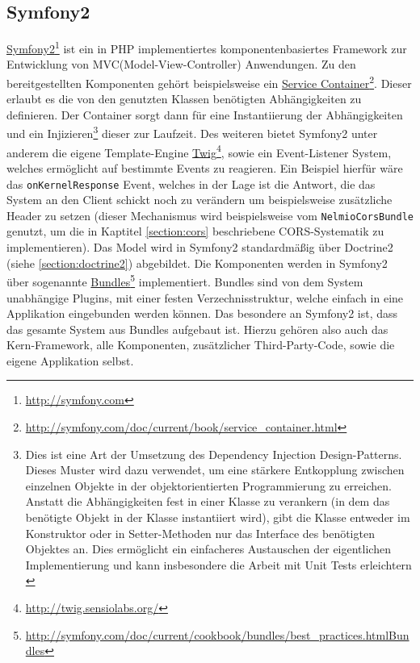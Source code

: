 \subsection{Symfony2}
\href{http://symfony.com}{Symfony2}\footnote{\url{http://symfony.com}} ist ein in PHP implementiertes komponentenbasiertes Framework zur Entwicklung von MVC(Model-View-Controller) Anwendungen. Zu den bereitgestellten Komponenten gehört beispielsweise ein \href{http://symfony.com/doc/current/book/service_container.html}{Service Container}\footnote{\url{http://symfony.com/doc/current/book/service_container.html}}. Dieser erlaubt es die von den genutzten Klassen benötigten Abhängigkeiten zu definieren. Der Container sorgt dann für eine Instantiierung der Abhängigkeiten und ein Injizieren\footnote{Dies ist eine Art der Umsetzung des Dependency Injection Design-Patterns. Dieses Muster wird dazu verwendet, um eine stärkere Entkopplung zwischen einzelnen Objekte in der objektorientierten Programmierung zu erreichen. Anstatt die Abhängigkeiten fest in einer Klasse zu verankern (in dem das benötigte Objekt in der Klasse instantiiert wird), gibt die Klasse entweder im Konstruktor oder in Setter-Methoden nur das Interface des benötigten Objektes an. Dies ermöglicht ein einfacheres Austauschen der eigentlichen Implementierung und kann insbesondere die Arbeit mit Unit Tests erleichtern \cite{fowler_dependency_injection}} dieser zur Laufzeit. Des weiteren bietet Symfony2 unter anderem die eigene Template-Engine \href{http://twig.sensiolabs.org/}{Twig}\footnote{\url{http://twig.sensiolabs.org/}}, sowie ein Event-Listener System, welches ermöglicht auf bestimmte Events zu reagieren. Ein Beispiel hierfür wäre das \texttt{onKernelResponse} Event, welches in der Lage ist die Antwort, die das System an den Client schickt noch zu verändern um beispielsweise zusätzliche Header zu setzen (dieser Mechanismus wird beispielsweise vom \texttt{NelmioCorsBundle} genutzt, um die in Kaptitel \ref{section:cors} beschriebene CORS-Systematik zu implementieren). Das Model wird in Symfony2 standardmäßig über Doctrine2 (siehe \ref{section:doctrine2}) abgebildet.
Die Komponenten werden in Symfony2 über sogenannte \href{http://symfony.com/doc/current/cookbook/bundles/best_practices.htmlBundles}{Bundles}\footnote{\url{http://symfony.com/doc/current/cookbook/bundles/best_practices.htmlBundles}} implementiert. Bundles sind von dem System unabhängige Plugins, mit einer festen Verzechnisstruktur, welche einfach in eine Applikation eingebunden werden können. Das besondere an Symfony2 ist, dass das gesamte System aus Bundles aufgebaut ist. Hierzu gehören also auch das Kern-Framework, alle Komponenten, zusätzlicher Third-Party-Code, sowie die eigene Applikation selbst.

